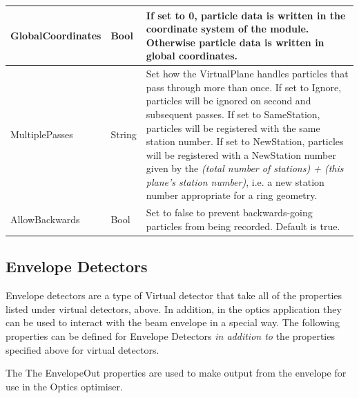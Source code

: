 \begin{center}
\begin{supertabular}{|m{3.665cm}|m{1.3579999cm}|m{11.973001cm}|}
GlobalCoordinates &
Bool &
If set to 0, particle data is written in the coordinate system of the module. Otherwise particle data is written in
global coordinates.\\\hline
MultiplePasses &
String &
Set how the VirtualPlane handles particles that pass through more than once. If set to Ignore, particles will be ignored
on second and subsequent passes. If set to SameStation, particles will be registered with the same station number. If
set to NewStation, particles will be registered with a NewStation number given by the \textit{(total number of
stations) + (this plane's station number)}, i.e. a new station number appropriate for a ring geometry.\\\hline
AllowBackwards &
Bool &
Set to false to prevent backwards-going particles from being recorded. Default is true.\\\hline
\end{supertabular}
\end{center}

\subsection{Envelope Detectors}
Envelope detectors are a type of Virtual detector that take all of the properties listed under virtual detectors, above.
In addition, in the optics application they can be used to interact with the beam envelope in a special way. The
following properties can be defined for Envelope Detectors \textit{in addition to} the properties specified above for
virtual detectors.

The The EnvelopeOut properties are used to make output from the envelope for use in the Optics optimiser.

